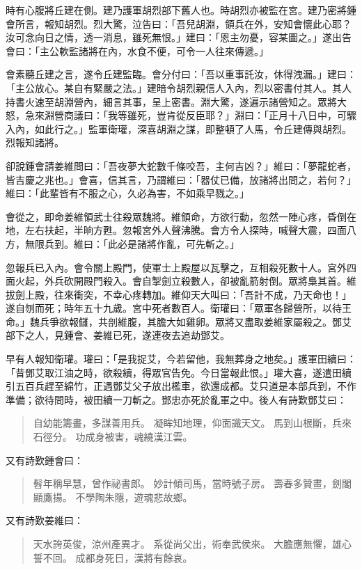 時有心腹將丘建在側。建乃護軍胡烈部下舊人也。時胡烈亦被監在宮。建乃密將鍾會所言，報知胡烈。烈大驚，泣告曰：「吾兒胡淵，領兵在外，安知會懷此心耶？汝可念向日之情，透一消息，雖死無恨。」建曰：「恩主勿憂，容某圖之。」遂出告會曰：「主公軟監諸將在內，水食不便，可令一人往來傳遞。」

會素聽丘建之言，遂令丘建監臨。會分付曰：「吾以重事託汝，休得洩漏。」建曰：「主公放心。某自有緊嚴之法。」建暗令胡烈親信人入內，烈以密書付其人。其人持書火速至胡淵營內，細言其事，呈上密書。淵大驚，遂遍示諸營知之。眾將大怒，急來淵營商議曰：「我等雖死，豈肯從反臣耶？」淵曰：「正月十八日中，可驟入內，如此行之。」監軍衛瓘，深喜胡淵之謀，即整頓了人馬，令丘建傳與胡烈。烈報知諸將。

卻說鍾會請姜維問曰：「吾夜夢大蛇數千條咬吾，主何吉凶？」維曰：「夢龍蛇者，皆吉慶之兆也。」會喜，信其言，乃謂維曰：「器仗已備，放諸將出問之，若何？」維曰：「此輩皆有不服之心，久必為害，不如乘早戮之。」

會從之，即命姜維領武士往殺眾魏將。維領命，方欲行動，忽然一陣心疼，昏倒在地，左右扶起，半晌方甦。忽報宮外人聲沸騰。會方令人探時，喊聲大震，四面八方，無限兵到。維曰：「此必是諸將作亂，可先斬之。」

忽報兵已入內。會令關上殿門，使軍士上殿屋以瓦擊之，互相殺死數十人。宮外四面火起，外兵砍開殿門殺入。會自掣劍立殺數人，卻被亂箭射倒。眾將梟其首。維拔劍上殿，往來衝突，不幸心疼轉加。維仰天大叫曰：「吾計不成，乃天命也！」遂自刎而死；時年五十九歲。宮中死者數百人。衛瓘曰：「眾軍各歸營所，以待王命。」魏兵爭欲報讎，共剖維腹，其膽大如雞卵。眾將又盡取姜維家屬殺之。鄧艾部下之人，見鍾會、姜維已死，遂連夜去追劫鄧艾。

早有人報知衛瓘。瓘曰：「是我捉艾，今若留他，我無葬身之地矣。」護軍田續曰：「昔鄧艾取江油之時，欲殺續，得眾官告免。今日當報此恨。」瓘大喜，遂遣田續引五百兵趕至綿竹，正遇鄧艾父子放出檻車，欲還成都。艾只道是本部兵到，不作準備；欲待問時，被田續一刀斬之。鄧忠亦死於亂軍之中。後人有詩歎鄧艾曰：

\begin{quote}
自幼能籌畫，多謀善用兵。
凝眸知地理，仰面識天文。
馬到山根斷，兵來石徑分。
功成身被害，魂繞漢江雲。
\end{quote}

又有詩歎鍾會曰：

\begin{quote}
髫年稱早慧，曾作祕書郎。
妙計傾司馬，當時號子房。
壽春多贊畫，劍閣顯鷹揚。
不學陶朱隱，遊魂悲故鄉。
\end{quote}

又有詩歎姜維曰：

\begin{quote}
天水誇英俊，涼州產異才。
系從尚父出，術奉武侯來。
大膽應無懼，雄心誓不回。
成都身死日，漢將有餘哀。
\end{quote}

